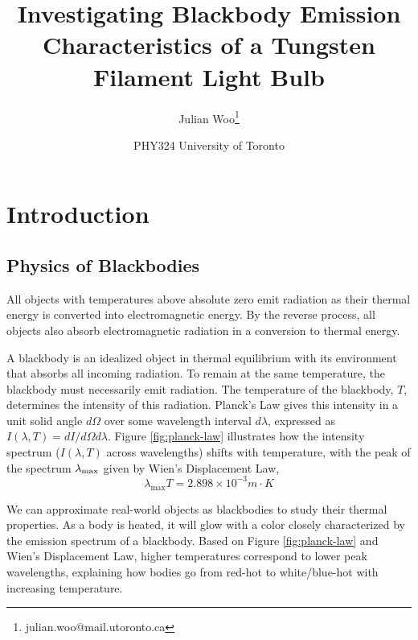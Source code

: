 \documentclass[
	a4paper, %
	10pt, %
	twoside, %
]{journal}
\title{\textcolor{bluehead}{Investigating Blackbody Emission Characteristics of a Tungsten Filament Light Bulb}} %
\author{%
    Julian Woo\thanks{julian.woo@mail.utoronto.ca}}
\date{\small PHY324 University of Toronto}
\begin{document}
\maketitle %




\section{Introduction}
\subsection{Physics of Blackbodies}
All objects with temperatures above absolute zero emit radiation as their thermal energy is converted into electromagnetic energy. By the reverse process, all objects also absorb electromagnetic radiation in a conversion to thermal energy. 

A blackbody is an idealized object in thermal equilibrium with its environment that absorbs all incoming radiation. To remain at the same temperature, the blackbody must necessarily emit radiation. The temperature of the blackbody, $T$, determines the intensity of this radiation. Planck's Law gives this intensity in a unit solid angle $d\Omega$ over some wavelength interval $d\lambda$, expressed as $I(\lambda, T)= dI/d\Omega d\lambda$. 
Figure \ref{fig:planck-law} illustrates how the intensity spectrum ($I(\lambda, T)$ across wavelengths) shifts with temperature, with the peak of the spectrum ${\lambda}_{\textrm{max}}$ given by Wien's Displacement Law, 
\begin{equation}
    \label{eqn:wein_displacement}
    \lambda_{\text{max}} T = 2.898 \times 10^{-3}\unit{m \cdot K}
\end{equation}

We can approximate real-world objects as blackbodies to study their thermal properties. As a body is heated, it will glow with a color closely characterized by the emission spectrum of a blackbody. Based on Figure \ref{fig:planck-law} and Wien's Displacement Law, higher temperatures correspond to lower peak wavelengths, explaining how bodies go from red-hot to white/blue-hot with increasing temperature. 
\end{document}
